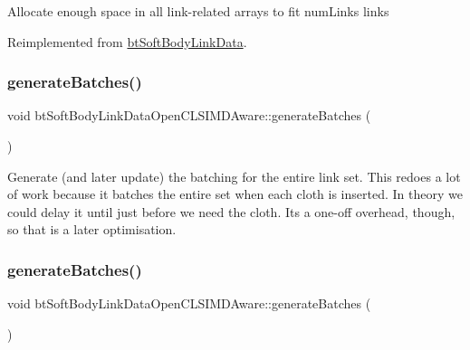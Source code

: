 Allocate enough space in all link-\/related arrays to fit num\+Links links 

Reimplemented from \hyperlink{classbtSoftBodyLinkData_a1713d14604037ca88d7915d627a32a13}{bt\+Soft\+Body\+Link\+Data}.

\mbox{\label{classbtSoftBodyLinkDataOpenCLSIMDAware_afe1f0f82b680db86b53f86711444e5e0}} 
\subsubsection{\texorpdfstring{generate\+Batches()}{generateBatches()}\hspace{0.1cm}{\footnotesize\ttfamily [1/2]}}
{\footnotesize\ttfamily void bt\+Soft\+Body\+Link\+Data\+Open\+C\+L\+S\+I\+M\+D\+Aware\+::generate\+Batches (\begin{DoxyParamCaption}{ }\end{DoxyParamCaption})}

Generate (and later update) the batching for the entire link set. This redoes a lot of work because it batches the entire set when each cloth is inserted. In theory we could delay it until just before we need the cloth. It\textquotesingle{}s a one-\/off overhead, though, so that is a later optimisation. \mbox{\label{classbtSoftBodyLinkDataOpenCLSIMDAware_afe1f0f82b680db86b53f86711444e5e0}} 
\subsubsection{\texorpdfstring{generate\+Batches()}{generateBatches()}\hspace{0.1cm}{\footnotesize\ttfamily [2/2]}}
{\footnotesize\ttfamily void bt\+Soft\+Body\+Link\+Data\+Open\+C\+L\+S\+I\+M\+D\+Aware\+::generate\+Batches (\begin{DoxyParamCaption}{ }\end{DoxyParamCaption})}

